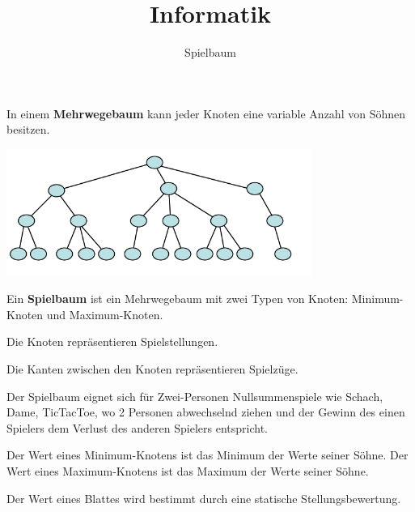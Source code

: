 \usepackage[ngerman]{babel}
\usepackage[utf8]{inputenc}
\usepackage{amsmath}
\usepackage{amssymb}
\usepackage{listings} 
\usepackage{stmaryrd}
\lstset{language=Python, tabsize=4, showstringspaces=false,basicstyle=\footnotesize,mathescape=true}
\usepackage{mathtools}
\usepackage{ulem}
\usepackage{tikz}

\parskip 10pt




\title{Informatik}   
\author{Spielbaum} 
\date{}
\frame{\titlepage} 
\small
\begin{frame}[fragile]

In einem \textbf{Mehrwegebaum} kann jeder Knoten eine variable Anzahl von Söhnen besitzen. 


\includegraphics[width=10cm]{bild1a.png} 

\end{frame}


\begin{frame}[fragile]
Ein \textbf{Spielbaum} ist ein Mehrwegebaum mit zwei Typen von Knoten: Minimum-Knoten und
Maximum-Knoten.  \pause

Die Knoten repräsentieren Spielstellungen. 

Die Kanten zwischen den Knoten repräsentieren Spielzüge. \pause

Der Spielbaum eignet sich für Zwei-Personen Nullsummenspiele wie Schach, Dame, TicTacToe, wo 2 Personen
 abwechselnd ziehen und der Gewinn des einen Spielers dem Verlust des anderen Spielers entspricht. \pause
 
Der Wert eines Minimum-Knotens ist das Minimum der Werte seiner Söhne. 
Der Wert eines Maximum-Knotens ist das Maximum der Werte seiner Söhne.   \pause

Der Wert eines Blattes wird bestimmt durch eine statische Stellungsbewertung.
\end{frame}

